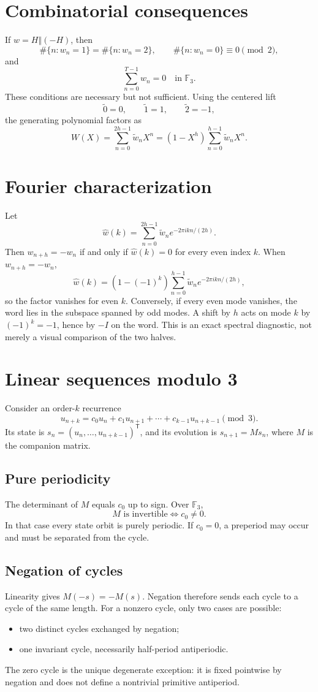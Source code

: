 \documentclass[11pt,a4paper]{article}
\newcommand{\F}{\mathbb F}\newcommand{\Z}{\mathbb Z}\newcommand{\concat}{\mathbin{\Vert}}
\begin{document}
\section{Combinatorial consequences}
If \(w=H\concat(-H)\), then \[\#\{n:w_n=1\}=\#\{n:w_n=2\},\qquad \#\{n:w_n=0\}\equiv0\pmod2,\] and \[\sum_{n=0}^{T-1}w_n=0\quad\text{in }\F_3.\] These conditions are necessary but not sufficient. Using the centered lift \[\widetilde0=0,\qquad \widetilde1=1,\qquad \widetilde2=-1,\] the generating polynomial factors as \[W(X)=\sum_{n=0}^{2h-1}\widetilde w_nX^n=(1-X^h)\sum_{n=0}^{h-1}\widetilde w_nX^n.\]
\section{Fourier characterization}
Let \[\widehat w(k)=\sum_{n=0}^{2h-1}\widetilde w_ne^{-2\pi i kn/(2h)}.\] Then \(w_{n+h}=-w_n\) if and only if \(\widehat w(k)=0\) for every even index \(k\). When \(w_{n+h}=-w_n\), \[\widehat w(k)=\left(1-(-1)^k\right)\sum_{n=0}^{h-1}\widetilde w_ne^{-2\pi i kn/(2h)},\] so the factor vanishes for even \(k\). Conversely, if every even mode vanishes, the word lies in the subspace spanned by odd modes. A shift by \(h\) acts on mode \(k\) by \((-1)^k=-1\), hence by \(-I\) on the word. This is an exact spectral diagnostic, not merely a visual comparison of the two halves.
\section{Linear sequences modulo 3}
Consider an order-\(k\) recurrence \[u_{n+k}=c_0u_n+c_1u_{n+1}+\cdots+c_{k-1}u_{n+k-1}\pmod3.\] Its state is \(s_n=(u_n,\ldots,u_{n+k-1})^{\mathsf T}\), and its evolution is \(s_{n+1}=Ms_n\), where \(M\) is the companion matrix.
\subsection{Pure periodicity}
The determinant of \(M\) equals \(c_0\) up to sign. Over \(\F_3\), \[M\text{ is invertible}\iff c_0\neq0.\] In that case every state orbit is purely periodic. If \(c_0=0\), a preperiod may occur and must be separated from the cycle.
\subsection{Negation of cycles}
Linearity gives \(M(-s)=-M(s)\). Negation therefore sends each cycle to a cycle of the same length. For a nonzero cycle, only two cases are possible: \begin{itemize}\item two distinct cycles exchanged by negation;\item one invariant cycle, necessarily half-period antiperiodic.\end{itemize} The zero cycle is the unique degenerate exception: it is fixed pointwise by negation and does not define a nontrivial primitive antiperiod.
\end{document}
